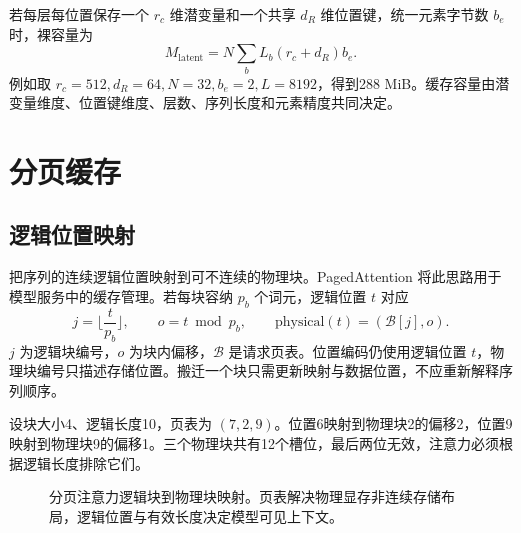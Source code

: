 \documentclass[../textbook.tex]{subfiles}
\begin{document}
若每层每位置保存一个 $r_c$ 维潜变量和一个共享 $d_R$ 维位置键，统一元素字节数 $b_e$ 时，裸容量为
\begin{equation}
 M_{\mathrm{latent}}=N\sum_bL_b(r_c+d_R)b_e.
\end{equation}
例如取 $r_c=512,d_R=64,N=32,b_e=2,L=8192$，得到288 MiB。缓存容量由潜变量维度、位置键维度、层数、序列长度和元素精度共同决定。

\section{分页缓存}

\subsection{逻辑位置映射}
把序列的连续逻辑位置映射到可不连续的物理块。PagedAttention 将此思路用于模型服务中的缓存管理\cite{kwon2023pagedattention}。若每块容纳 $p_b$ 个词元，逻辑位置 $t$ 对应
\begin{equation}
 j=\lfloor \frac{t}{p_b}\rfloor,\qquad o=t\bmod p_b,
 \qquad \mathrm{physical}(t)=(\mathcal B[j],o).
 \label{eq:cache-page}
\end{equation}
$j$ 为逻辑块编号，$o$ 为块内偏移，$\mathcal B$ 是请求页表。位置编码仍使用逻辑位置 $t$，物理块编号只描述存储位置。搬迁一个块只需更新映射与数据位置，不应重新解释序列顺序。

设块大小4、逻辑长度10，页表为 $(7,2,9)$。位置6映射到物理块2的偏移2，位置9映射到物理块9的偏移1。三个物理块共有12个槽位，最后两位无效，注意力必须根据逻辑长度排除它们。

\begin{figure}[htbp]
\centering
{}
\caption[分页注意力逻辑块到物理块映射]{分页注意力逻辑块到物理块映射。页表解决物理显存非连续存储布局，逻辑位置与有效长度决定模型可见上下文。}\label{fig:cache-pages}
\end{figure}
\end{document}
